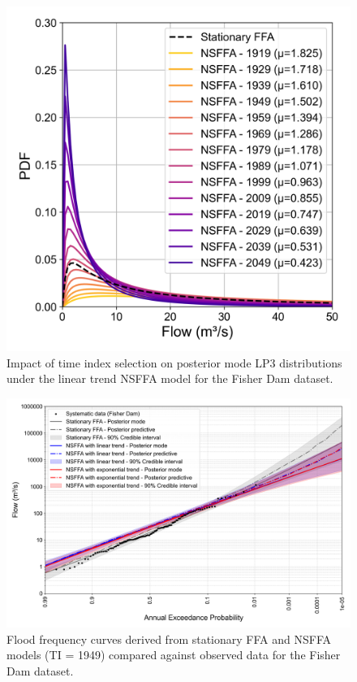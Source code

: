 \begin{figure}[H]
    \centering
    \includegraphics[width=1\linewidth]{_plots/OCD_LP3_linear_mu_comparison_TI.png}
    \caption{Impact of time index selection on posterior mode LP3 distributions under the linear trend NSFFA model for the Fisher Dam dataset.}
    \label{fig:OCD_LP3_linear_mu_comparison_TI}
\end{figure}

\begin{figure}[ht!]
    \centering
    \includegraphics[width=1\linewidth]{_plots/OCD_bayesian_flood_quantiles_lp3_nonstationary.png}    
    \caption{Flood frequency curves derived from stationary FFA and NSFFA models (TI = 1949) compared against observed data for the Fisher Dam dataset. }

    \label{fig:OCD_bayesian_flood_quantiles_lp3_nonstationary}
\end{figure}

